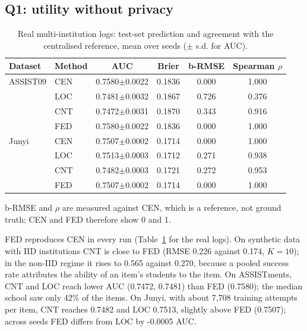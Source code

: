 \documentclass[pdflatex,iicol,sn-mathphys-num]{sn-jnl}
\theoremstyle{thmstyleone}
\newenvironment{widetable}{\begin{table}[t]}{\end{table}}
\newcommand{\AssistCNTAuc}{0.7472}
\newcommand{\AssistCovMedian}{42}
\newcommand{\AssistFEDAuc}{0.7580}
\newcommand{\AssistLOCAuc}{0.7481}
\newcommand{\GJunyiFedLocDiff}{-0.0005}
\newcommand{\JunyiCNTAuc}{0.7482}
\newcommand{\JunyiFEDAuc}{0.7507}
\newcommand{\JunyiLOCAuc}{0.7513}
\newcommand{\JunyiRespPerItem}{7,708}
\newcommand{\SynTenIidCNTRmse}{0.226}
\newcommand{\SynTenIidFEDRmse}{0.174}
\newcommand{\SynTenNonCNTRmse}{0.565}
\newcommand{\SynTenNonFEDRmse}{0.270}
\begin{document}
\subsection{Q1: utility without privacy}\label{sec:eval-utility}

\begin{widetable}
\centering
\caption{Real multi-institution logs: test-set prediction and agreement with the centralised reference, mean over seeds ($\pm$ s.d. for AUC).}
\label{tab:real}
\small
\begin{tabular}{llcccc}
\toprule
Dataset & Method & AUC & Brier & b-RMSE & Spearman $\rho$ \\
\midrule
ASSIST09 & CEN & 0.7580$\pm$0.0022 & 0.1836 & 0.000 & 1.000 \\
 & LOC & 0.7481$\pm$0.0032 & 0.1867 & 0.726 & 0.376 \\
 & CNT & 0.7472$\pm$0.0031 & 0.1870 & 0.343 & 0.916 \\
 & FED & 0.7580$\pm$0.0022 & 0.1836 & 0.000 & 1.000 \\
\midrule
Junyi & CEN & 0.7507$\pm$0.0002 & 0.1714 & 0.000 & 1.000 \\
 & LOC & 0.7513$\pm$0.0003 & 0.1712 & 0.271 & 0.938 \\
 & CNT & 0.7482$\pm$0.0003 & 0.1721 & 0.272 & 0.953 \\
 & FED & 0.7507$\pm$0.0002 & 0.1714 & 0.000 & 1.000 \\
\bottomrule
\end{tabular}
\par\smallskip\footnotesize b-RMSE and $\rho$ are measured against CEN, which is a reference, not ground truth; CEN and FED therefore show 0 and 1.
\end{widetable}

FED reproduces CEN in every run (Table~\ref{tab:real} for the real logs). On synthetic data with IID institutions CNT is close to FED (RMSE \SynTenIidCNTRmse{} against \SynTenIidFEDRmse{}, $K=10$); in the non-IID regime it rises to \SynTenNonCNTRmse{} against \SynTenNonFEDRmse{}, because a pooled success rate attributes the ability of an item's students to the item. On ASSISTments, CNT and LOC reach lower AUC (\AssistCNTAuc{}, \AssistLOCAuc{}) than FED (\AssistFEDAuc{}); the median school saw only \AssistCovMedian\% of the items. On Junyi, with about \JunyiRespPerItem{} training attempts per item, CNT reaches \JunyiCNTAuc{} and LOC \JunyiLOCAuc{}, slightly above FED (\JunyiFEDAuc{}); across seeds FED differs from LOC by \GJunyiFedLocDiff{} AUC.
\end{document}
